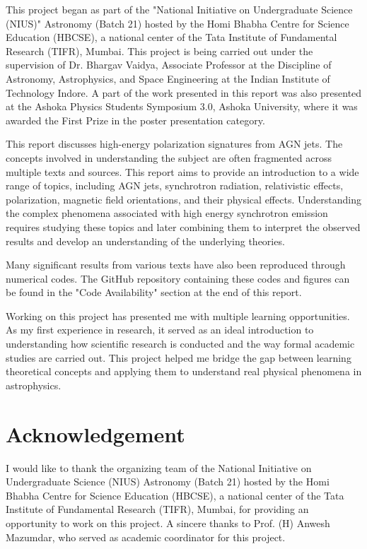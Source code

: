 \documentclass{article}
\begin{document}
This project began as part of the "National Initiative on Undergraduate Science (NIUS)" Astronomy (Batch 21) hosted by the Homi Bhabha Centre for Science Education (HBCSE), a national center of the Tata Institute of Fundamental Research (TIFR), Mumbai. This project is being carried out under the supervision of Dr. Bhargav Vaidya, Associate Professor at the Discipline of Astronomy, Astrophysics, and Space Engineering at the Indian Institute of Technology Indore. A part of the work presented in this report was also presented at the Ashoka Physics Students Symposium 3.0, Ashoka University, where it was awarded the First Prize in the poster presentation category.

This report discusses high-energy polarization signatures from AGN jets. The concepts involved in understanding the subject are often fragmented across multiple texts and sources. This report aims to provide an introduction to a wide range of topics, including AGN jets, synchrotron radiation, relativistic effects, polarization, magnetic field orientations, and their physical effects. Understanding the complex phenomena associated with high energy synchrotron emission requires studying these topics and later combining them to interpret the observed results and develop an understanding of the underlying theories. 

Many significant results from various texts have also been reproduced through numerical codes. The GitHub repository containing these codes and figures can be found in the "Code Availability" section at the end of this report.

Working on this project has presented me with multiple learning opportunities. As my first experience in research, it served as an ideal introduction to understanding how scientific research is conducted and the way formal academic studies are carried out. This project helped me bridge the gap between learning theoretical concepts and applying them to understand real physical phenomena in astrophysics.
\newpage

\section*{Acknowledgement}
I would like to thank the organizing team of the National Initiative on Undergraduate Science (NIUS) Astronomy (Batch 21) hosted by the Homi Bhabha Centre for Science Education (HBCSE), a national center of the Tata Institute of Fundamental Research (TIFR), Mumbai, for providing an opportunity to work on this project. A sincere thanks to Prof. (H) Anwesh Mazumdar, who served as academic coordinator for this project.
\end{document}
